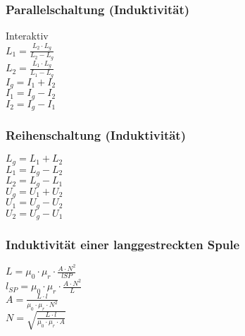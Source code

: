 \subsubsection{Parallelschaltung (Induktivität)} 
\begin{minipage}{0.45\textwidth} 
Interaktiv\\ 
$ L_{1}  = \frac{L_{2} \cdot L_{g} }{L_{2} -L_{g} } $\\ 
$ L_{2}  = \frac{L_{1} \cdot L_{g} }{L_{1} -L_{g} } $\\ 
$ I_{g}  = I_{1}  + I_{2} $\\ 
$ I_{1}  = I_{g}  - I_{2} $\\ 
$ I_{2}  = I_{g}  - I_{1} $\\ 
\end{minipage} 
\begin{minipage}{0.45\textwidth} 
 
\end{minipage} 
\subsubsection{Reihenschaltung (Induktivität)} 
\begin{minipage}{0.45\textwidth} 
$ L_{g}  = L_{1}  + L_{2} $\\ 
$ L_{1}  = L_{g}  - L_{2} $\\ 
$ L_{2}  = L_{g}  - L_{1} $\\ 
$ U_{g}  = U_{1}  + U_{2} $\\ 
$ U_{1}  = U_{g}  - U_{2} $\\ 
$ U_{2}  = U_{g}  - U_{1} $\\ 
\end{minipage} 
\begin{minipage}{0.45\textwidth} 
 
\end{minipage} 
\subsubsection{Induktivität einer langgestreckten Spule} 
\begin{minipage}{0.45\textwidth} 
$ L = \mu _{0} \cdot \mu _{r} \cdot \frac{A\cdot N^{2} }{lSP} $\\ 
$ l_{SP} = \mu _{0} \cdot \mu _{r} \cdot \frac{A\cdot N^{2} }{L} $\\ 
$ A = \frac{ L\cdot l}{\mu _{0} \cdot \mu _{r} \cdot N^{2} } $\\ 
$ N = \sqrt{\frac{ L\cdot l}{\mu _{0} \cdot \mu _{r} \cdot A}} $\\ 
\end{minipage} 
\begin{minipage}{0.45\textwidth} 
 
\end{minipage} 
